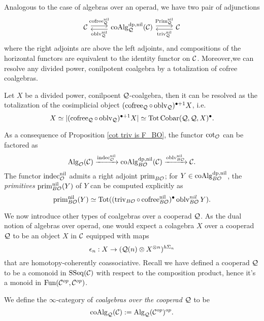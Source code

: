 Analogous to the case of algebras over an operad, we have two pair of adjunctions 
\[
\begin{tikzcd}
\CC & \coAlg^{\divpow, \nil}_{\CQ}(\CC) & \CC
	\arrow[from=1-1, to= 1-2, shift left = 1, "\cofree^{\nil}_{\CQ}" above]
	\arrow[from=1-2, to=1-1, shift left = 1, "\oblv^{\nil}_{\CQ}" below]
	\arrow[from=1-2, to= 1-3, shift left = 1, "\operatorname{Prim}^{\nil}_{\CQ}" above]
	\arrow[from=1-3, to=1-2, shift left = 1, "\trivial^{\nil}_{\CQ}" below]
\end{tikzcd}
\]
where the right adjoints are above the left adjoints,
and compositions of the horizontal functors are equivalent to the identity functor on ${\mathcal{C}}$.
Moreover,we can resolve any divided power, conilpotent coalgebra by a totalization of cofree coalgebras.
\begin{proposition}
Let $X$ be a divided power, conilpoent ${\mathcal{Q}}$-coalgebra, then it can be resolved as the totalization of the cosimplicial object $(\operatorname{cofree}_{{\mathcal{Q}}}\circ \operatorname{oblv}_{{\mathcal{Q}}})^{\bullet + 1}X$, i.e. 
\begin{equation}
\label{(3.5)}
    X \simeq
|(\operatorname{cofree}_{{\mathcal{Q}}}\circ \operatorname{oblv}_{{\mathcal{Q}}})^{\bullet + 1}X|
\simeq \operatorname{\operatorname{Tot}} \operatorname{Cobar}({\mathcal{Q}}, {\mathcal{Q}}, X)^{\bullet}.
\end{equation}
\end{proposition}




As a consequence of Proposition \ref{cot triv is F_BO}, the functor $\cot_{{\mathcal{O}}}$ can be factored as 
$$
\operatorname{Alg}_{{\mathcal{O}}}({\mathcal{C}}) \xrightarrow{\operatorname{indec}^{\operatorname{nil}}_{{\mathcal{O}}}}
\operatorname{coAlg}^{\operatorname{dp}, \operatorname{nil}}_{B{\mathcal{O}}}({\mathcal{C}})
\xrightarrow{\operatorname{oblv}_{B{\mathcal{O}}}^{\operatorname{nil}}}
{\mathcal{C}}.
$$
The functor $\operatorname{indec}^{\operatorname{nil}}_{{\mathcal{O}}}$ admits a right adjoint $\operatorname{prim}_{B{\mathcal{O}}}$;
for $Y \in \operatorname{coAlg}^{\operatorname{dp}, \operatorname{nil}}_{B{\mathcal{O}}} $, the \emph{primitives} $\operatorname{prim}_{B{\mathcal{O}}}^{\operatorname{nil}}(Y)$ of $Y$ can be computed explicitly as \cite[Lemma 4.7]  {Heuts_Koszul}
$$
\operatorname{prim}_{B{\mathcal{O}}}^{\operatorname{nil}}(Y) \simeq \operatorname{\operatorname{Tot}} ( (\operatorname{triv}_{B{\mathcal{O}}}\circ \operatorname{cofree}^{\operatorname{nil}}_{B{\mathcal{O}}})^{\bullet} \operatorname{oblv}^{nil}_{B{\mathcal{O}}} Y).
$$


We now introduce other types of coalgebras over a cooperad ${\mathcal{Q}}$. 
As the dual notion of algebras over operad, one would expect a colagebra $X$ over a cooperad ${\mathcal{Q}}$ to be an object $X$ in ${\mathcal{C}}$ equipped with maps
$$
\epsilon_n: X \to  ({\mathcal{Q}}(n) \otimes X^{\otimes n})^{h\Sigma_n}
$$
that are homotopy-coherently coassociative. Recall we have defined a cooperad ${\mathcal{Q}}$ to be a comonoid in $\operatorname{SSeq}({\mathcal{C}})$ with respect to the composition product, hence it's a monoid in $\operatorname{Fun}({\mathcal{C}}^{op}, {\mathcal{C}}^{op})$. 
\begin{definition}
    \label{coalgebras over cooperads}
    We define the $\infty$-category of \emph{coalgebras over the cooperad ${\mathcal{Q}}$} to be 
    $$
    \operatorname{coAlg}_{{\mathcal{Q}}}({\mathcal{C}}) := \operatorname{Alg}_{{\mathcal{Q}}}({\mathcal{C}}^{op})^{op}.
    $$
\end{definition}

